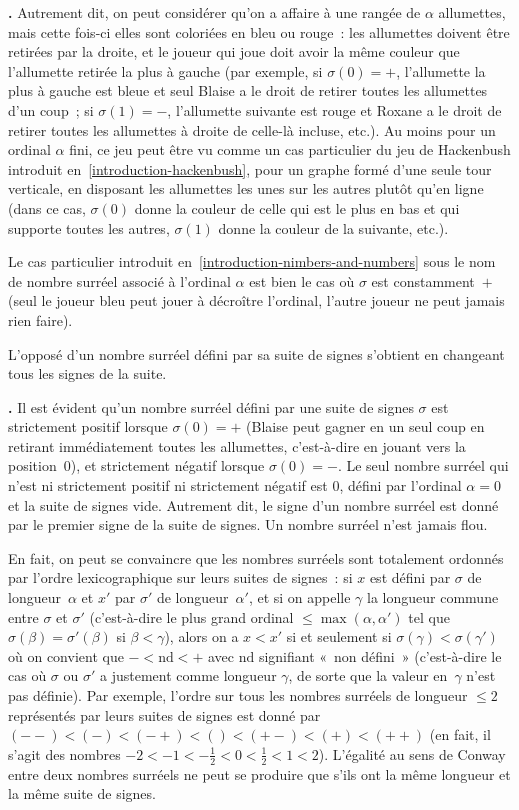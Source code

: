 \documentclass[12pt,a4paper]{article}
\theoremstyle{definition}
\newcommand\thingy{%
\refstepcounter{comcnt}\smallskip\noindent\textbf{\thecomcnt.} }
\begin{document}
\thingy Autrement dit, on peut considérer qu'on a affaire à une rangée
de $\alpha$ allumettes, mais cette fois-ci elles sont coloriées en
bleu ou rouge : les allumettes doivent être retirées par la droite, et
le joueur qui joue doit avoir la même couleur que l'allumette retirée
la plus à gauche (par exemple, si $\sigma(0)=+$, l'allumette la plus à
gauche est bleue et seul Blaise a le droit de retirer toutes les
allumettes d'un coup ; si $\sigma(1)=-$, l'allumette suivante est
rouge et Roxane a le droit de retirer toutes les allumettes à droite
de celle-là incluse, etc.).  Au moins pour un ordinal $\alpha$ fini,
ce jeu peut être vu comme un cas particulier du jeu de Hackenbush
introduit en \ref{introduction-hackenbush}, pour un graphe formé d'une
seule tour verticale, en disposant les allumettes les unes sur les
autres plutôt qu'en ligne (dans ce cas, $\sigma(0)$ donne la couleur
de celle qui est le plus en bas et qui supporte toutes les autres,
$\sigma(1)$ donne la couleur de la suivante, etc.).

Le cas particulier introduit en \ref{introduction-nimbers-and-numbers}
sous le nom de nombre surréel associé à l'ordinal $\alpha$ est bien le
cas où $\sigma$ est constamment $+$ (seul le joueur bleu peut jouer à
décroître l'ordinal, l'autre joueur ne peut jamais rien faire).

L'opposé d'un nombre surréel défini par sa suite de signes s'obtient
en changeant tous les signes de la suite.

\thingy Il est évident qu'un nombre surréel défini par une suite de
signes $\sigma$ est strictement positif lorsque $\sigma(0)=+$ (Blaise
peut gagner en un seul coup en retirant immédiatement toutes les
allumettes, c'est-à-dire en jouant vers la position $0$), et
strictement négatif lorsque $\sigma(0)=-$.  Le seul nombre surréel qui
n'est ni strictement positif ni strictement négatif est $0$, défini
par l'ordinal $\alpha=0$ et la suite de signes vide.  Autrement dit,
le signe d'un nombre surréel est donné par le premier signe de la
suite de signes.  Un nombre surréel n'est jamais flou.

En fait, on peut se convaincre que les nombres surréels sont
totalement ordonnés par l'ordre lexicographique sur leurs suites de
signes : si $x$ est défini par $\sigma$ de longueur $\alpha$ et $x'$
par $\sigma'$ de longueur $\alpha'$, et si on appelle $\gamma$ la
longueur commune entre $\sigma$ et $\sigma'$ (c'est-à-dire le plus
grand ordinal $\leq\max(\alpha,\alpha')$ tel que $\sigma(\beta) =
\sigma'(\beta)$ si $\beta<\gamma$), alors on a $x<x'$ si et seulement
si $\sigma(\gamma) < \sigma(\gamma')$ où on convient que $- <
\mathrm{nd} < +$ avec $\mathrm{nd}$ signifiant « non défini »
(c'est-à-dire le cas où $\sigma$ ou $\sigma'$ a justement comme
longueur $\gamma$, de sorte que la valeur en $\gamma$ n'est pas
définie).  Par exemple, l'ordre sur tous les nombres surréels de
longueur $\leq 2$ représentés par leurs suites de signes est donné par
$(--) < (-) < (-+) < () < (+-) < (+) < (++)$ (en fait, il s'agit des
nombres $-2 < -1 < -\frac{1}{2} < 0 < \frac{1}{2} < 1 < 2$).
L'égalité au sens de Conway entre deux nombres surréels ne peut se
produire que s'ils ont la même longueur et la même suite de signes.
\end{document}
